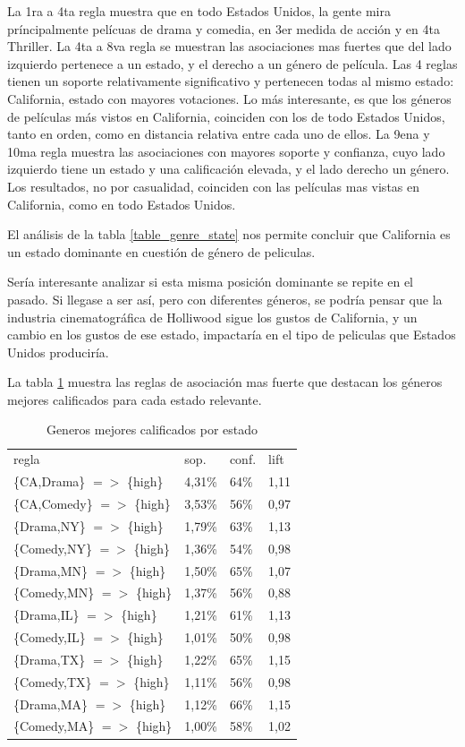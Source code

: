 \documentclass[journal]{IEEEtran}
\begin{document}
La 1ra a 4ta regla muestra que en todo Estados Unidos, 
la gente mira príncipalmente pelícuas de drama y comedia, 
en 3er medida de acción y en 4ta  Thriller. 
La 4ta a 8va regla se muestran las asociaciones mas fuertes que del 
lado izquierdo pertenece a un estado, y el derecho a un género
de película. Las 4 reglas tienen un soporte relativamente significativo y
pertenecen todas al mismo estado: California, estado con mayores votaciones.
Lo más interesante, es que los géneros de películas más vistos en California,
coinciden con los de todo Estados Unidos, tanto en orden, como en distancia
relativa entre cada uno de ellos.
La 9ena y 10ma regla muestra las asociaciones con mayores soporte y confianza, cuyo
lado izquierdo tiene un estado y una calificación elevada, y el lado derecho
un género. Los resultados, no por casualidad, coinciden con las películas
mas vistas en California, como en todo Estados Unidos.

El análisis de la tabla \ref{table_genre_state} nos permite concluir que
California es un estado dominante en cuestión de género de peliculas. 

Sería interesante analizar si esta misma posición dominante se repite en el pasado.
Si llegase a ser así, pero con diferentes géneros, se podría pensar que la industria
cinematográfica de Holliwood sigue los gustos de California, y un cambio en los 
gustos de ese estado, impactaría en el tipo de peliculas que Estados Unidos produciría.

La tabla \ref{table_genre_state_high} muestra las reglas de asociación mas fuerte que
destacan los géneros mejores calificados para cada estado relevante.

\begin{table}[ht!]
\caption{Generos mejores calificados por estado}
\label{table_genre_state_high}
\centering
\begin{tabular}{l l l l }
regla & sop. & conf. & lift \\
\{CA,Drama\} $=$$>$ \{high\} & 4,31\% & 64\% & 1,11 \\
\{CA,Comedy\} $=$$>$ \{high\} & 3,53\% & 56\% & 0,97 \\
\{Drama,NY\} $=$$>$ \{high\} & 1,79\% & 63\% &  1,13 \\
\{Comedy,NY\} $=$$>$ \{high\} & 1,36\% & 54\% &  0,98 \\
\{Drama,MN\} $=$$>$ \{high\} & 1,50\% & 65\% &  1,07 \\
\{Comedy,MN\} $=$$>$ \{high\} & 1,37\% & 56\% &  0,88 \\
\{Drama,IL\} $=$$>$ \{high\} & 1,21\% & 61\% & 1,13 \\
\{Comedy,IL\} $=$$>$ \{high\} & 1,01\% & 50\% & 0,98 \\
\{Drama,TX\} $=$$>$ \{high\} & 1,22\% & 65\% & 1,15 \\
\{Comedy,TX\} $=$$>$ \{high\} & 1,11\% & 56\% & 0,98 \\
\{Drama,MA\} $=$$>$ \{high\} & 1,12\% & 66\% & 1,15 \\
\{Comedy,MA\} $=$$>$ \{high\} & 1,00\% & 58\% & 1,02 \\
\end{tabular}
\end{table}
\end{document}
